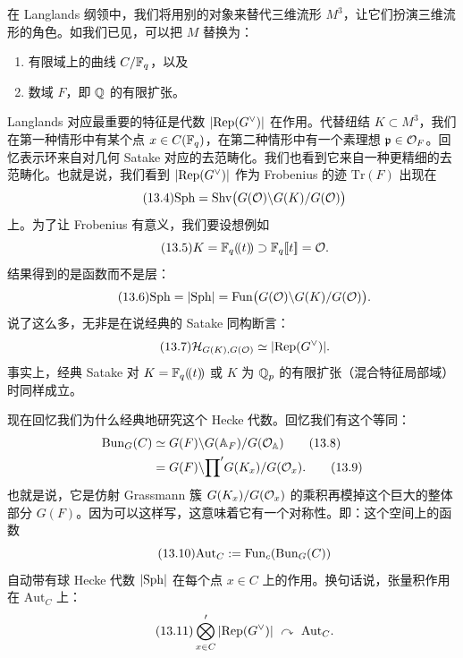 在 Langlands 纲领中，我们将用别的对象来替代三维流形 $M^3$，让它们扮演三维流形的角色。如我们已见，可以把 $M$ 替换为：
\begin{enumerate}
\item 有限域上的曲线 $C/\mathbb{F}_q$，以及
\item 数域 $F$，即 $\mathbb{Q}$ 的有限扩张。
\end{enumerate}

Langlands 对应最重要的特征是代数 $|\mathrm{Rep}(G^\vee)|$ 在作用。代替纽结 $K\subset M^3$，我们在第一种情形中有某个点 $x\in C(\mathbb{F}_q)$，在第二种情形中有一个素理想 $\mathfrak p\in\mathcal{O}_F$。回忆表示环来自对几何 Satake 对应的去范畴化。我们也看到它来自一种更精细的去范畴化。也就是说，我们看到 $|\mathrm{Rep}(G^\vee)|$ 作为 Frobenius 的迹 $\mathrm{Tr}(F)$ 出现在
\begin{equation}\tag{13.4}
\mathrm{Sph}=\mathrm{Shv}\bigl(G(\mathcal{O})\backslash G(K)/G(\mathcal{O})\bigr)
\end{equation}
上。为了让 Frobenius 有意义，我们要设想例如
\begin{equation}\tag{13.5}
K=\mathbb{F}_q(\!(t)\!)\supset \mathbb{F}_q[\![t]\!]=\mathcal{O}.
\end{equation}
结果得到的是函数而不是层：
\begin{equation}\tag{13.6}
\mathrm{Sph}=|\mathrm{Sph}|=\mathrm{Fun}\bigl(G(\mathcal{O})\backslash G(K)/G(\mathcal{O})\bigr).
\end{equation}
说了这么多，无非是在说经典的 Satake 同构断言：
\begin{equation}\tag{13.7}
\mathcal{H}_{G(K),G(\mathcal{O})}\simeq|\mathrm{Rep}(G^\vee)|.
\end{equation}
事实上，经典 Satake 对 $K=\mathbb{F}_q(\!(t)\!)$ 或 $K$ 为 $\mathbb{Q}_p$ 的有限扩张（混合特征局部域）时同样成立。

现在回忆我们为什么经典地研究这个 Hecke 代数。回忆我们有这个等同：
\begin{align}
\mathrm{Bun}_G(C)&\simeq G(F)\backslash G(\mathbb{A}_F)/G(\mathcal{O}_{\mathbb{A}}) \tag{13.8}\\
&=G(F)\backslash {\prod}' G(K_x)/G(\mathcal{O}_x). \tag{13.9}
\end{align}
也就是说，它是仿射 Grassmann 簇 $G(K_x)/G(\mathcal{O}_x)$ 的乘积再模掉这个巨大的整体部分 $G(F)$。因为可以这样写，这意味着它有一个对称性。即：这个空间上的函数
\begin{equation}\tag{13.10}
\mathrm{Aut}_C:=\mathrm{Fun}_c(\mathrm{Bun}_G(C))
\end{equation}
自动带有球 Hecke 代数 $|\mathrm{Sph}|$ 在每个点 $x\in C$ 上的作用。换句话说，张量积作用在 $\mathrm{Aut}_C$ 上：
\begin{equation}\tag{13.11}
\bigotimes'_{x\in C}|\Rep(G^\vee)|\ \curvearrowright\ \mathrm{Aut}_C.
\end{equation}

